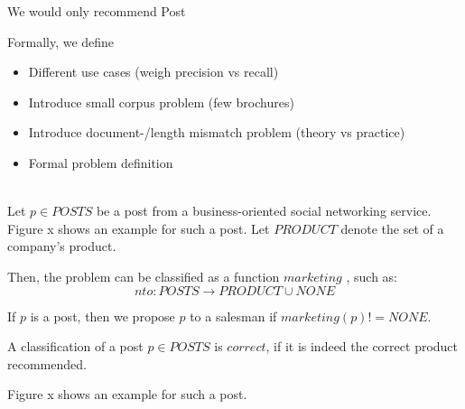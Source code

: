 We would only recommend Post

Formally, we define  




\begin{itemize}
	\item Different use cases (weigh precision vs recall)
	\item Introduce small corpus problem (few brochures)
	\item Introduce document-/length mismatch problem (theory vs practice)
	\item Formal problem definition
\end{itemize}

 \\
Let $p \in POSTS$ be a post from a business-oriented social networking service.
Figure x shows an example for such a post.
Let $PRODUCT$ denote the set of a company's product.

Then, the problem can be classified as a function $marketing$ , such as:
\begin{displaymath}
	nto: POSTS \to PRODUCT \cup {NONE}
\end{displaymath}

If $p$ is a post, then we propose $p$ to a salesman if $marketing(p) != NONE$.

A classification of a post $p \in POSTS$ is $correct$, if it is indeed the correct product recommended.

Figure x shows an example for such a post.


